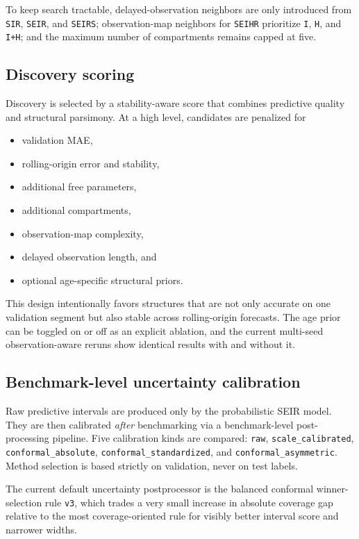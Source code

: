 To keep search tractable, delayed-observation neighbors are only introduced
from \texttt{SIR}, \texttt{SEIR}, and \texttt{SEIRS}; observation-map
neighbors for \texttt{SEIHR} prioritize \texttt{I}, \texttt{H}, and
\texttt{I+H}; and the maximum number of compartments remains capped at five.

\subsection{Discovery scoring}

Discovery is selected by a stability-aware score that combines predictive
quality and structural parsimony. At a high level, candidates are penalized for
\begin{itemize}[leftmargin=1.5em]
\item validation MAE,
\item rolling-origin error and stability,
\item additional free parameters,
\item additional compartments,
\item observation-map complexity,
\item delayed observation length, and
\item optional age-specific structural priors.
\end{itemize}

This design intentionally favors structures that are not only accurate on one
validation segment but also stable across rolling-origin forecasts. The age
prior can be toggled on or off as an explicit ablation, and the current
multi-seed observation-aware reruns show identical results with and without it.

\subsection{Benchmark-level uncertainty calibration}

Raw predictive intervals are produced only by the probabilistic SEIR model.
They are then calibrated \emph{after} benchmarking via a benchmark-level
post-processing pipeline. Five calibration kinds are compared:
\texttt{raw}, \texttt{scale\_calibrated}, \texttt{conformal\_absolute},
\texttt{conformal\_standardized}, and \texttt{conformal\_asymmetric}. Method
selection is based strictly on validation, never on test labels.

The current default uncertainty postprocessor is the balanced conformal
winner-selection rule \texttt{v3}, which trades a very small increase in
absolute coverage gap relative to the most coverage-oriented rule for visibly
better interval score and narrower widths.

